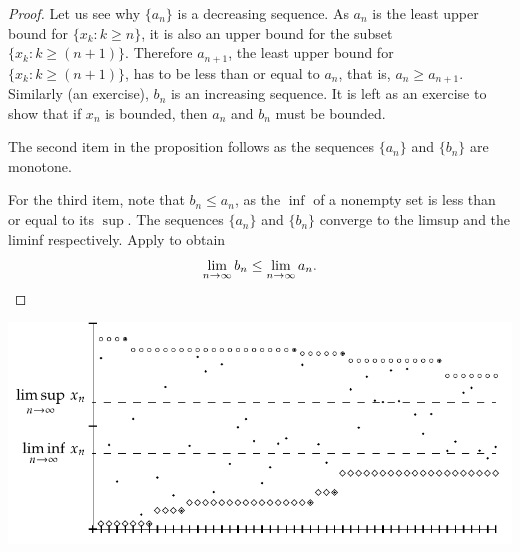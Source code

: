 \begin{proof}
Let us see why $\{ a_n \}$ is a decreasing sequence.  As $a_n$ is the least upper
bound for $\{ x_k : k \geq n \}$, it is also
an upper bound for the subset $\{ x_k : k \geq (n+1) \}$.  Therefore
$a_{n+1}$, the least upper bound for
$\{ x_k : k \geq (n+1) \}$, has to be less than or equal to $a_n$,
that is,
$a_n \geq a_{n+1}$.  Similarly (an exercise), $b_n$ is an increasing
sequence.  It is left as an exercise to show that
if $x_n$ is bounded, then $a_n$ and $b_n$ must be bounded.

The second item in the proposition follows as the sequences
$\{ a_n \}$ and $\{ b_n \}$ are monotone.

For the third item, note that $b_n \leq a_n$, as the $\inf$ of a nonempty set
is less than or equal to its $\sup$.  The sequences $\{ a_n \}$ and $\{ b_n \}$
converge to the limsup and the liminf respectively.
Apply  to obtain
\begin{equation*}
\lim_{n\to \infty} b_n \leq \lim_{n\to \infty} a_n.  \qedhere
\end{equation*}
\end{proof}
\begin{myfigureht}
\includegraphics{figures/sequence-limsupliminf_an_bn}
\caption{First 50 terms of an example sequence.  Terms $x_n$ of the sequence are
marked with dots
(\raisebox{0.25ex}{\tiny$\bullet$}),
$a_n$ are marked with
circles ($\circ$), and
$b_n$ are marked with diamonds ($\diamond$).\label{sequence-limsupliminf_an_bn}}
\end{myfigureht}

